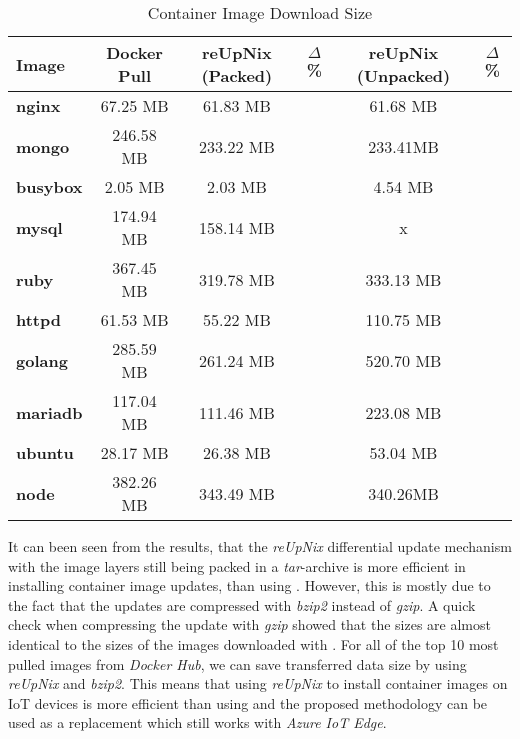 \begin{table}[H]
	\centering
	\begin{tabular}{l|c|c|c|c|c}
	\toprule
	 Image & Docker Pull & reUpNix (Packed) & $\Delta$ \% & reUpNix (Unpacked) & $\Delta$ \%\\
	\midrule
    \textbf{nginx} & 67.25 MB & 61.83 MB & \color{ba-green}{- 8.0 \%} & 61.68 MB & \color{ba-green}{- 8.2 \%}\\
    \textbf{mongo} & 246.58 MB & 233.22 MB & \color{ba-green}{- 5.6 \%} & 233.41MB & \color{ba-green}{- 5.3 \%}\\
    \textbf{busybox} & 2.05 MB & 2.03 MB & \color{ba-green}{- 0.9 \%} & 4.54 MB & \color{ba-red}{+ 121.4 \%}\\
    \textbf{mysql} & 174.94 MB & 158.14 MB & \color{ba-green}{- 9.6 \%} & x & \color{ba-red}{+ x \%}\\
    \textbf{ruby} & 367.45 MB & 319.78 MB & \color{ba-green}{- 12.9 \%} & 333.13 MB & \color{ba-green}{- 9.3 \%}\\
    \textbf{httpd} & 61.53 MB & 55.22 MB & \color{ba-green}{- 10.2 \%} & 110.75 MB & \color{ba-red}{+ x \%}\\
    \textbf{golang} & 285.59 MB & 261.24 MB & \color{ba-green}{- 8.5 \%} & 520.70 MB & \color{ba-red}{+ x \%}\\
    \textbf{mariadb} & 117.04 MB & 111.46 MB & \color{ba-green}{- 4.7 \%} & 223.08 MB & \color{ba-red}{+ x \%}\\
    \textbf{ubuntu} & 28.17 MB & 26.38 MB & \color{ba-green}{- 6.3 \%} & 53.04 MB & \color{ba-red}{+ 84.7 \%}\\
    \textbf{node} & 382.26 MB & 343.49 MB & \color{ba-green}{- 10.1 \%} & 340.26MB & \color{ba-green}{- 10.9 \%}\\
	\bottomrule
	\end{tabular}
	\caption{Container Image Download Size}
	\label{tab:container-size}
\end{table}

\noindent
It can been seen from the results, that the \textit{reUpNix} differential update mechanism
with the image layers still being packed in a \textit{tar}-archive is more efficient
in installing container image updates, than using .
However, this is mostly due to the fact that the updates are compressed with \textit{bzip2}
instead of \textit{gzip}. A quick check when compressing the update with \textit{gzip}
showed that the sizes are almost identical to the sizes of the images downloaded
with .
For all of the top 10 most pulled images from \textit{Docker Hub}, we can save
transferred data size by using \textit{reUpNix} and \textit{bzip2}. This means
that using \textit{reUpNix} to install container images on \ac{IoT} devices is more
efficient than using  and the proposed methodology can be used
as a replacement which still works with \textit{Azure IoT Edge}.

